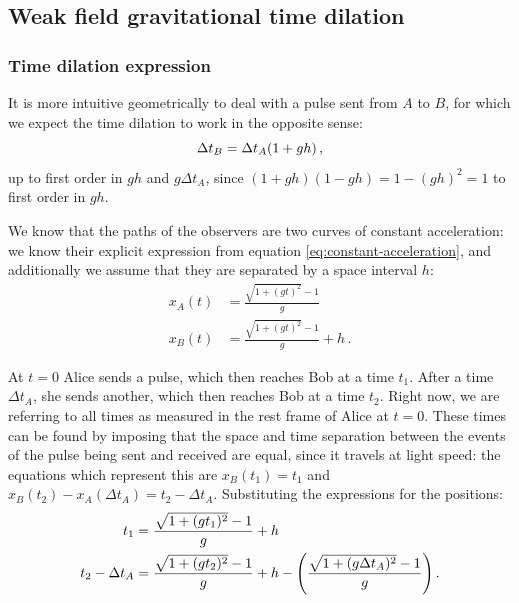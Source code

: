 \documentclass[main.tex]{subfiles}
\begin{document}
\subsection{Weak field gravitational time dilation}

\subsubsection{Time dilation expression}

It is more intuitive geometrically to deal with a pulse sent from \(A\) to \(B\), for which we expect the time dilation to work in the opposite sense: 
%
\begin{equation}
  \Delta t_B = \Delta t_A \qty(1 + gh)
\,,
\end{equation}
%
up to first order in \(gh\) and \(g\Delta t_A\), since \((1+gh )(1-gh) = 1-(gh)^2 = 1\) to first order in \(gh\).

We know that the paths of the observers are two curves of constant acceleration: we know their explicit expression from equation \eqref{eq:constant-acceleration}, and additionally we assume that they are separated by a space interval \(h\): 
%
\begin{subequations}
\begin{align}
  x_A(t) &= \frac{\sqrt{1 + (gt)^2} -1}{g} \\ 
  x_B(t) &= \frac{\sqrt{1 + (gt)^2} -1}{g} + h
  \,.
\end{align}
\end{subequations}

At \(t=0\) Alice sends a pulse, which then reaches Bob at a time \(t_1\). After a time \(\Delta t_A\), she sends another, which then reaches Bob at a time \(t_2 \). 
Right now, we are referring to all times as measured in the rest frame of Alice at \(t=0\).
These times can be found by imposing that the space and time separation between the events of the pulse being sent and received are equal, since it travels at light speed: the equations which represent this are \(x_B(t_1) = t_1\) and \(x_B(t_2 ) -x_A (\Delta t_A) = t_2 - \Delta t_A\). Substituting the expressions for the positions:
%
\begin{subequations}
\begin{align}
  t_1 &= \frac{\sqrt{1+(g t_1 )^2} -1}{g} +h \\
  t_2 - \Delta t_A &= \frac{\sqrt{1+(gt_2 )^2} -1}{g} + h - \qty(\frac{\sqrt{1+(g \Delta t_A )^2} -1}{g})\,.
\end{align}
\end{subequations}
\end{document}
